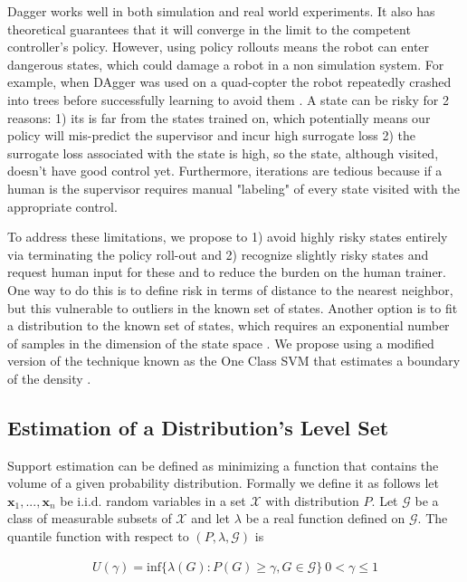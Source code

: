 \documentclass[10pt, conference]{ieeeconf}      %
\begin{document}
Dagger works well in both simulation and real world experiments. It also has theoretical guarantees that it will converge in the limit to the competent controller's policy. However, using policy rollouts means the robot can enter dangerous states, which could damage a robot in a non simulation system. For example, when DAgger was used on a quad-copter the robot repeatedly crashed into trees before successfully learning to avoid them \cite{ross2013learning}. A state can be risky for 2 reasons: 1) its is far from the states trained on, which potentially means our policy will mis-predict the supervisor and incur high surrogate loss \cite{tokdar2010importance} 2) the surrogate loss associated with the state is high, so the state, although visited, doesn't have good control yet. Furthermore, iterations are tedious because if a human is the supervisor requires manual "labeling" of every state visited with the appropriate control. 

To address these limitations, we propose to 1) avoid highly risky states entirely via terminating the policy roll-out and 2) recognize slightly risky states and request human input for these and to reduce the burden on the human trainer. One way to do this is to define risk in terms of distance to the nearest neighbor, but this vulnerable to outliers in the known set of states. Another option is to fit a distribution to the known set of states, which requires an exponential number of samples in the dimension of the state space \cite{nadaraya1964estimating}. We propose using a modified version of the technique known as the One Class SVM that  estimates a boundary of the density \cite{scholkopf2001estimating}.


\subsection{Estimation of a Distribution's Level Set}\label{sec:level}
Support estimation can be defined as minimizing a function that contains the volume of a given probability distribution. Formally we define it as follows let $\mathbf{x}_1,...,\mathbf{x}_n $ be i.i.d. random variables in a set $\mathcal{X}$ with distribution $P$. Let $\mathcal{G}$ be a class of measurable subsets of $\mathcal{X}$ and let $\lambda$ be a real function defined on $\mathcal{G}$. The quantile function with respect to $(P,\lambda,\mathcal{G})$ is 

\vspace{-2ex}
\begin{align}\label{eq:quantile}
U(\gamma) = \mbox{inf} \lbrace \lambda(G):P(G) \geq \gamma, G \in \mathcal{G} \rbrace \: 0<\gamma \leq 1
\end{align} 
\end{document}
